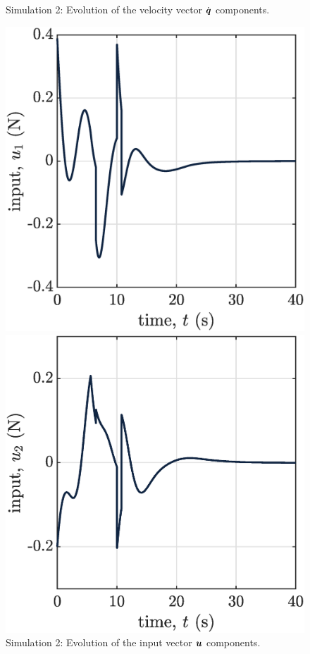 \begin{figure}[!ht]
\begin{minipage}[t]{.45\textwidth}
    \end{minipage}  
    \caption{\label{fig:sim2vel}Simulation 2: Evolution of the velocity vector $\dot{\boldsymbol{q}}$ components.}
    \begin{minipage}[t]{.45\textwidth}
        \centering
        \includegraphics[width=\textwidth]{figures/sim2u1.eps}
    \end{minipage}
    \hfill
    \begin{minipage}[t]{.45\textwidth}
        \centering
        \includegraphics[width=\textwidth]{figures/sim2u2.eps}
    \end{minipage} 
    \caption{\label{fig:sim2in}Simulation 2: Evolution of the input vector $\boldsymbol{u}$ components.}
\end{figure}

